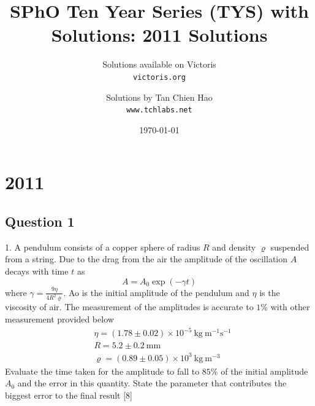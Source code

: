 \documentclass{article}
\title{SPhO Ten Year Series (TYS) with Solutions: 2011 Solutions}
\author{
    Solutions available on Victoris\\
    \texttt{victoris.org}
    \and 
    Solutions by Tan Chien Hao\\
    \texttt{www.tchlabs.net}
}
\date{\today}
\begin{document}
\maketitle


\section{2011}

\subsection{Question 1}
1. A pendulum consists of a copper sphere of radius $R$ and density $\varrho$ suspended from a string. Due to the drag from the air the amplitude of the oscillation $A$ decays with time $t$ as
$$
A=A_{0} \exp (-\gamma t)
$$
where $\gamma=\frac{9 \eta}{4 R^{2} \varrho}$. Ao is the initial amplitude of the pendulum and $\eta$ is the viscosity of air. The measurement of the amplitudes is accurate to $1\%$ with other measurement provided below
$$
\begin{aligned}
	&\eta=(1.78 \pm 0.02) \times 10^{-5} \mathrm{~kg} \mathrm{~m}^{-1} \mathrm{s}^{-1} \\
	&R=5.2 \pm 0.2 \mathrm{~mm} \\
	&\varrho=(0.89 \pm 0.05) \times 10^{3} \mathrm{~kg} \mathrm{~m}^{-3}
\end{aligned}
$$
Evaluate the time taken for the amplitude to fall to $85 \%$ of the initial amplitude $A_{0}$ and the error in this quantity. State the parameter that contributes the biggest error to the final result [8]
\end{document}
